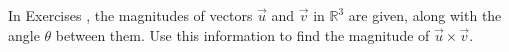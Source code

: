 {\noindent In Exercises}
{, the magnitudes of vectors $\vec u$ and $\vec v$ in $\mathbb{R}^3$ are given, along with the angle $\theta$ between them. Use this information to find the magnitude of $\vec u\times\vec v$.
}
